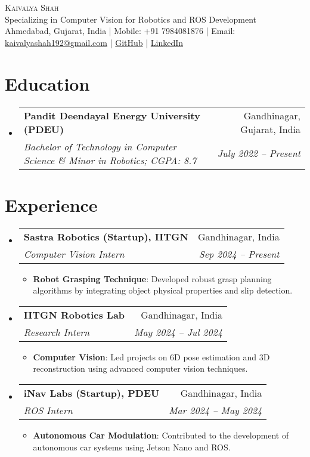 \documentclass[letterpaper,11pt]{article}
\makeatletter
\newcommand{\resumeItem}[2]{
  \item\small{
    \textbf{#1}{: #2 \vspace{-2pt}}
  }
}
\newcommand{\resumeSubheading}[4]{
  \vspace{-1pt}\item
    \begin{tabular*}{0.97\textwidth}{l@{\extracolsep{\fill}}r}
      \textbf{#1} & #2 \\
      \textit{\small#3} & \textit{\small #4} \\
    \end{tabular*}\vspace{-5pt}
}
\newcommand{\resumeSubHeadingListStart}{\begin{itemize}[leftmargin=*]}
\newcommand{\resumeSubHeadingListEnd}{\end{itemize}}
\newcommand{\resumeItemListStart}{\begin{itemize}}
\newcommand{\resumeItemListEnd}{\end{itemize}\vspace{-5pt}}
\makeatother
\begin{document}
\begin{center}
  {\Huge \scshape Kaivalya Shah} \\ \vspace{1pt}
  Specializing in Computer Vision for Robotics and ROS Development \\ \vspace{1pt}
  \small Ahmedabad, Gujarat, India | Mobile: +91 7984081876 | Email: \href{mailto:kaivalyashah192@gmail.com}{kaivalyashah192@gmail.com} | \href{https://github.com/Kaivalya192}{GitHub} | \href{https://www.linkedin.com/in/kaivalya192/}{LinkedIn}
\end{center}

\section{Education}
\resumeSubHeadingListStart
  \resumeSubheading
    {Pandit Deendayal Energy University (PDEU)}{Gandhinagar, Gujarat, India}
    {Bachelor of Technology in Computer Science \& Minor in Robotics; CGPA: 8.7}{July 2022 -- Present}
\resumeSubHeadingListEnd

\section{Experience}
\resumeSubHeadingListStart
  \resumeSubheading
    {Sastra Robotics (Startup), IITGN}{Gandhinagar, India}
    {Computer Vision Intern}{Sep 2024 -- Present}
    \resumeItemListStart
      \resumeItem{Robot Grasping Technique}
        {Developed robust grasp planning algorithms by integrating object physical properties and slip detection.}
    \resumeItemListEnd

  \resumeSubheading
    {IITGN Robotics Lab}{Gandhinagar, India}
    {Research Intern}{May 2024 -- Jul 2024}
    \resumeItemListStart
      \resumeItem{Computer Vision}
        {Led projects on 6D pose estimation and 3D reconstruction using advanced computer vision techniques.}
    \resumeItemListEnd

  \resumeSubheading
    {iNav Labs (Startup), PDEU}{Gandhinagar, India}
    {ROS Intern}{Mar 2024 -- May 2024}
    \resumeItemListStart
      \resumeItem{Autonomous Car Modulation}
        {Contributed to the development of autonomous car systems using Jetson Nano and ROS.}
    \resumeItemListEnd
\resumeSubHeadingListEnd

\end{document}
